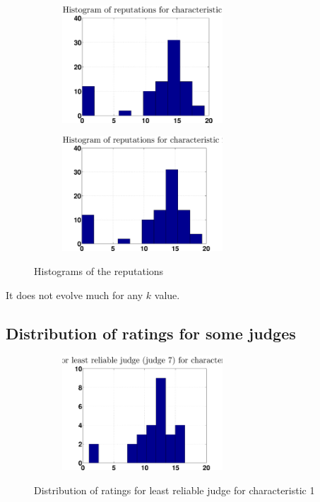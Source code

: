 \documentclass[12pt,a4paper]{article}
\begin{document}
\begin{figure}
\begin{subfigure}[b]{0.48\textwidth}
\end{subfigure}
\begin{subfigure}[b]{0.48\textwidth}
\includegraphics[width = 6cm]{noPreprocess/reputationHistK660c1.eps}
\end{subfigure}
\begin{subfigure}[b]{0.48\textwidth}
\includegraphics[width = 6cm]{noPreprocess/reputationHistK660c2.eps}
\end{subfigure}
\caption{Histograms of the reputations}
\end{figure}
It does not evolve much for any $k$ value.
\FloatBarrier
{}

\subsection*{Distribution of ratings for some judges}

\begin{figure}
\centering
\begin{subfigure}[b]{0.48\textwidth}
\includegraphics[width = 6cm]{noPreprocess/distribLeastRelK660c1.eps}
\end{subfigure}
\caption{Distribution of ratings for least reliable judge for characteristic 1}
\end{figure}
\end{document}
